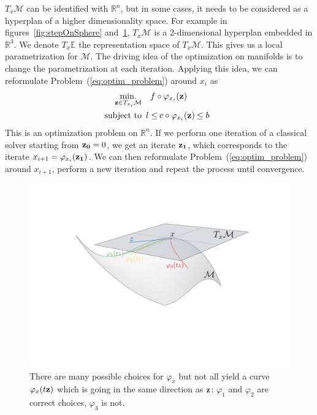 $T_x\mathcal{M}$ can be identified with $\mathbb{R}^n$, but in some cases, it needs to be considered as a hyperplan of a higher dimensionality space.
For example in figures~\ref{fig:stepOnSphere} and~\ref{fig:phimap}, $T_x\mathcal{M}$ is a 2-dimensional hyperplan embedded in $\mathbb{R}^3$.
We denote $T_x\mathbb{E}$ the representation space of $T_x\mathcal{M}$.
This gives us a local parametrization for $\mathcal{M}$.
The driving idea of the optimization on manifolds is to change the parametrization at each iteration.
Applying this idea, we can reformulate Problem~(\ref{eq:optim_problem}) around $x_i$ as
\begin{align}
\label{eq:local_problem}
\minimize_{{\bf z} \in T_{x_i}\mathcal{M}} & \quad f \circ \varphi_{x_i}({\bf z}) \\
  \text{subject to}&
  \begin{array}{rcl}
    {l} \leq & \reduce{c \circ \varphi_{x_i}({\bf z})}{8}& \leq {b} \nonumber
  \end{array}
\end{align}
This is an optimization problem on $\mathbb{R}^n$.
If we perform one iteration of a classical solver starting from ${\bf z_0} = 0$, we get an iterate ${\bf z_1}$, which corresponds to the iterate $x_{i+1} = \varphi_{x_i}({\bf z_1})$.
We can then reformulate Problem~(\ref{eq:optim_problem}) around $x_{i+1}$, perform a new iteration and repeat the process until convergence.

\begin{figure}[!htb]
  \centering
  \includegraphics[width=.9\linewidth]{Humanoids2015/manifold.pdf}
  \caption{There are many possible choices for $\varphi_{x}$ but not all yield a curve $\varphi_{x}(t{\bf z})$ which is going in the same direction as ${\bf z}$: $\varphi_{1}$ and $\varphi_{2}$ are correct choices, $\varphi_{3}$ is not.}
\label{fig:phimap}
\end{figure}


